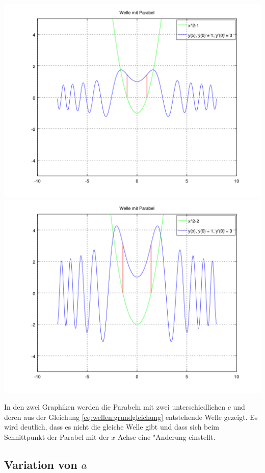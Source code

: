 \noindent
\includegraphics[scale=0.35]{./wellen/images/varc/cneg1.png}
\includegraphics[scale=0.35]{./wellen/images/varc/cneg2.png}

In den zwei Graphiken werden die Parabeln mit zwei unterschiedlichen $c$ und 
deren aus der Gleichung \ref{eq:wellen:grundgleichung} entstehende Welle 
gezeigt. Es wird deutlich, dass es nicht die gleiche Welle gibt und dass sich 
beim Schnittpunkt der Parabel mit der $x$-Achse eine "Anderung einstellt.

\subsection{Variation von \texorpdfstring{$a$}{a}}
\label{subsec:wellen:variationa}

